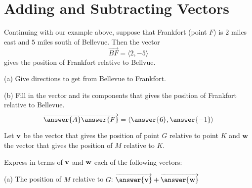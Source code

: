 \documentclass{ximera}
\begin{document}
\section{Adding and Subtracting Vectors}
Continuing with our example above, suppose that Frankfort (point $F$) is $2$ miles east and $5$ miles south of Bellevue. Then the vector
\[
    \overrightarrow{BF}  = \langle 2, -5\rangle
\]
gives the position of Frankfort relative to Bellvue. 


\begin{question} \label{Q233:Vectors}
(a) Give directions to get from Bellevue to Frankfort.

(b) Fill in the vector and its components that gives the position of Frankfort relative to Bellevue.
\[
       \overrightarrow{\answer{A} \answer{F}}    =  \langle  \answer{6} , \answer{-1}  \rangle 
\]

\end{question}


\begin{question}  \label{Q543:Vectors}
Let ${\bf v}$ be the vector that gives the position of point $G$ relative to point $K$ and ${\bf w}$ the vector that gives the position of $M$ relative to $K$. 

Express in terms of ${\bf v}$ and ${\bf w}$ each of the following vectors: 

(a) The position of $M$ relative to $G$:  $\overrightarrow{\bf \answer{v}} +  \overrightarrow{\bf \answer{w}} $

\end{question}






 
\begin{onlineOnly}
    \begin{center}
\end{center}
\end{onlineOnly}
\end{document}
